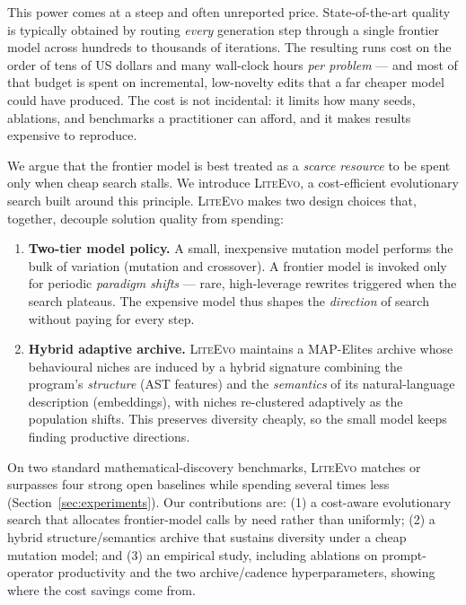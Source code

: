 \documentclass[10pt,twocolumn]{article}
\newcommand{\liteevo}{\textsc{LiteEvo}}
\begin{document}
This power comes at a steep and often unreported price. State-of-the-art
quality is typically obtained by routing \emph{every} generation step through a
single frontier model across hundreds to thousands of iterations. The
resulting runs cost on the order of tens of US dollars and many wall-clock
hours \emph{per problem} --- and most of that budget is spent on incremental,
low-novelty edits that a far cheaper model could have produced. The cost is not
incidental: it limits how many seeds, ablations, and benchmarks a practitioner
can afford, and it makes results expensive to reproduce.

We argue that the frontier model is best treated as a \emph{scarce resource}
to be spent only when cheap search stalls. We introduce \liteevo, a
cost-efficient evolutionary search built around this principle. \liteevo{}
makes two design choices that, together, decouple solution quality from
spending:

\begin{enumerate}
\itemsep2pt
\item \textbf{Two-tier model policy.} A small, inexpensive mutation model
performs the bulk of variation (mutation and crossover). A frontier model is
invoked only for periodic \emph{paradigm shifts} --- rare, high-leverage
rewrites triggered when the search plateaus. The expensive model thus shapes
the \emph{direction} of search without paying for every step.

\item \textbf{Hybrid adaptive archive.} \liteevo{} maintains a MAP-Elites
archive whose behavioural niches are induced by a hybrid signature combining
the program's \emph{structure} (AST features) and the \emph{semantics} of its
natural-language description (embeddings), with niches re-clustered adaptively
as the population shifts. This preserves diversity cheaply, so the small model
keeps finding productive directions.
\end{enumerate}

On two standard mathematical-discovery benchmarks, \liteevo{} matches or
surpasses four strong open baselines while spending several times less
(Section~\ref{sec:experiments}). Our contributions are: (1) a cost-aware
evolutionary search that allocates frontier-model calls by need rather than
uniformly; (2) a hybrid structure/semantics archive that sustains diversity
under a cheap mutation model; and (3) an empirical study, including ablations
on prompt-operator productivity and the two archive/cadence hyperparameters,
showing where the cost savings come from.
\end{document}
